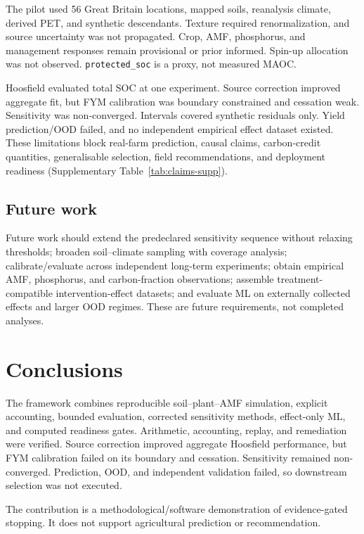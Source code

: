\documentclass[11pt]{article}
\newcommand{\protectedSOC}{\texttt{protected\_soc}}
\begin{document}
The pilot used 56 Great Britain locations, mapped soils, reanalysis climate, derived PET, and synthetic descendants. Texture required renormalization, and source uncertainty was not propagated. Crop, AMF, phosphorus, and management responses remain provisional or prior informed. Spin-up allocation was not observed. \protectedSOC{} is a proxy, not measured MAOC.

Hoosfield evaluated total SOC at one experiment. Source correction improved aggregate fit, but FYM calibration was boundary constrained and cessation weak. Sensitivity was non-converged. Intervals covered synthetic residuals only. Yield prediction/OOD failed, and no independent empirical effect dataset existed. These limitations block real-farm prediction, causal claims, carbon-credit quantities, generalisable selection, field recommendations, and deployment readiness (Supplementary Table~\ref{tab:claims-supp}).

\subsection{Future work}

Future work should extend the predeclared sensitivity sequence without relaxing thresholds; broaden soil--climate sampling with coverage analysis; calibrate/evaluate across independent long-term experiments; obtain empirical AMF, phosphorus, and carbon-fraction observations; assemble treatment-compatible intervention-effect datasets; and evaluate ML on externally collected effects and larger OOD regimes. These are future requirements, not completed analyses.

\section{Conclusions}

The framework combines reproducible soil--plant--AMF simulation, explicit accounting, bounded evaluation, corrected sensitivity methods, effect-only ML, and computed readiness gates. Arithmetic, accounting, replay, and remediation were verified. Source correction improved aggregate Hoosfield performance, but FYM calibration failed on its boundary and cessation. Sensitivity remained non-converged. Prediction, OOD, and independent validation failed, so downstream selection was not executed.

The contribution is a methodological/software demonstration of evidence-gated stopping. It does not support agricultural prediction or recommendation.
\end{document}
